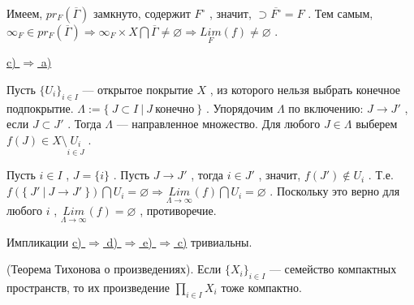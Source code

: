Имеем, \( pr_F(\overline{\Gamma}) \) замкнуто, содержит \( F^{\circ} \) , значит, \( \supset \overline{F^{\circ}}=F \) . Тем самым, \( \infty_F \in pr_F(\overline{\Gamma}) \Rightarrow \infty_F\times X \bigcap \overline{\Gamma} \neq \varnothing \Rightarrow \underset{F}{Lim}(f) \neq \varnothing \) .

\vspace
\underline{c) \( \Rightarrow \) a)}
\vspace

Пусть \( \{U_i\}_{i \in I} \) --- открытое покрытие \( X \) , из которого нельзя выбрать конечное подпокрытие. \( \Lambda:=\{~J \subset I~|~J~ \text{конечно} ~\} \) . Упорядочим \( \Lambda \) по включению: \( J \rightarrow J' \) , если \( J \subset J' \) . Тогда \( \Lambda \) --- направленное множество. Для любого \( J \in \Lambda \) выберем \( f(J) \in X \setminus \underset{i \in J}{U_i} \) .

Пусть \( i \in I \) , \( J=\{i\} \) . Пусть \( J \rightarrow J' \) , тогда \( i \in J' \) , значит, \( f(J') \notin U_i \) . Т.е. \( f(\{~J'~|~J \rightarrow J'~\}) \bigcap U_i = \varnothing \Rightarrow \underset{\Lambda \rightarrow \infty}{Lim}(f) \bigcap U_i = \varnothing \) . Поскольку это верно для любого \( i \) , \( \underset{\Lambda \rightarrow \infty}{Lim}(f) = \varnothing \) , противоречие.

\vspace
Импликации \underline{c) \( \Rightarrow \) d) \( \Rightarrow \) e) \( \Rightarrow \) c)} тривиальны.

\SSendp

\SSsect[!!!] (Теорема Тихонова о произведениях).
Если \( \{X_i\}_{i \in I} \) --- семейство компактных пространств, то их произведение \( \underset{i \in I}{\prod} X_i \) тоже компактно.

\pagebreak

\SSbullet 


